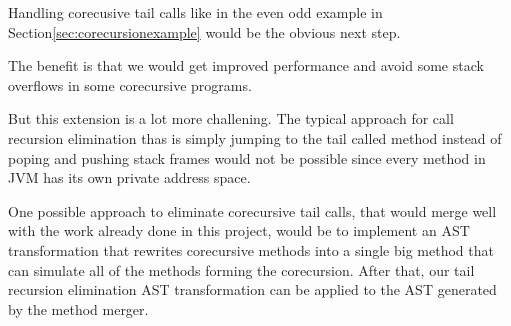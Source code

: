 Handling corecusive tail calls like in the even odd example in Section\ref{sec:corecursionexample} would be the obvious next step.

The benefit is that we would get improved performance and avoid some stack overflows in some corecursive programs.

But this extension is a lot more challening. The typical approach for call recursion elimination thas is simply jumping to the tail called method instead of poping and pushing stack frames would not be possible since every method in JVM has its own private address space.

One possible approach to eliminate corecursive tail calls, that would merge well with the work already done in this project, would be to implement an AST transformation that rewrites corecursive methods into a single big method that can simulate all of the methods forming the corecursion. After that, our tail recursion elimination AST transformation can be applied to the AST generated by the method merger.
